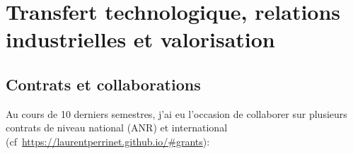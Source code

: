 \documentclass[10pt,french,a4paper,oneside]{article}%
\begin{document}
\section{Transfert technologique, relations industrielles et valorisation} %


\subsection{Contrats et collaborations} %
Au cours de 10 derniers semestres, j'ai eu l'occasion de collaborer sur plusieurs contrats de niveau national (ANR) et international (cf~\url{https://laurentperrinet.github.io/#grants}):
\end{document}
